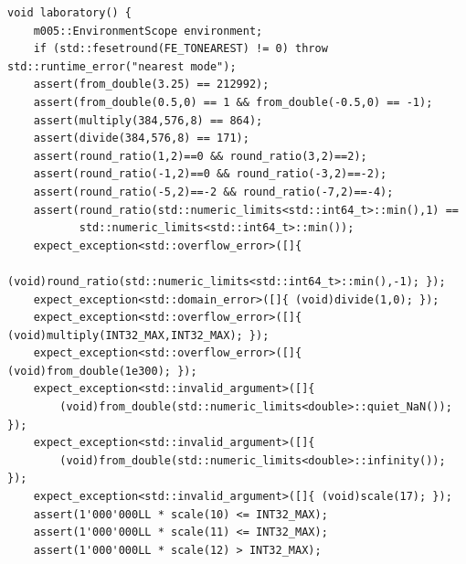\begin{verbatim}
void laboratory() {
    m005::EnvironmentScope environment;
    if (std::fesetround(FE_TONEAREST) != 0) throw std::runtime_error("nearest mode");
    assert(from_double(3.25) == 212992);
    assert(from_double(0.5,0) == 1 && from_double(-0.5,0) == -1);
    assert(multiply(384,576,8) == 864);
    assert(divide(384,576,8) == 171);
    assert(round_ratio(1,2)==0 && round_ratio(3,2)==2);
    assert(round_ratio(-1,2)==0 && round_ratio(-3,2)==-2);
    assert(round_ratio(-5,2)==-2 && round_ratio(-7,2)==-4);
    assert(round_ratio(std::numeric_limits<std::int64_t>::min(),1) ==
           std::numeric_limits<std::int64_t>::min());
    expect_exception<std::overflow_error>([]{
        (void)round_ratio(std::numeric_limits<std::int64_t>::min(),-1); });
    expect_exception<std::domain_error>([]{ (void)divide(1,0); });
    expect_exception<std::overflow_error>([]{ (void)multiply(INT32_MAX,INT32_MAX); });
    expect_exception<std::overflow_error>([]{ (void)from_double(1e300); });
    expect_exception<std::invalid_argument>([]{
        (void)from_double(std::numeric_limits<double>::quiet_NaN()); });
    expect_exception<std::invalid_argument>([]{
        (void)from_double(std::numeric_limits<double>::infinity()); });
    expect_exception<std::invalid_argument>([]{ (void)scale(17); });
    assert(1'000'000LL * scale(10) <= INT32_MAX);
    assert(1'000'000LL * scale(11) <= INT32_MAX);
    assert(1'000'000LL * scale(12) > INT32_MAX);


\end{verbatim}
